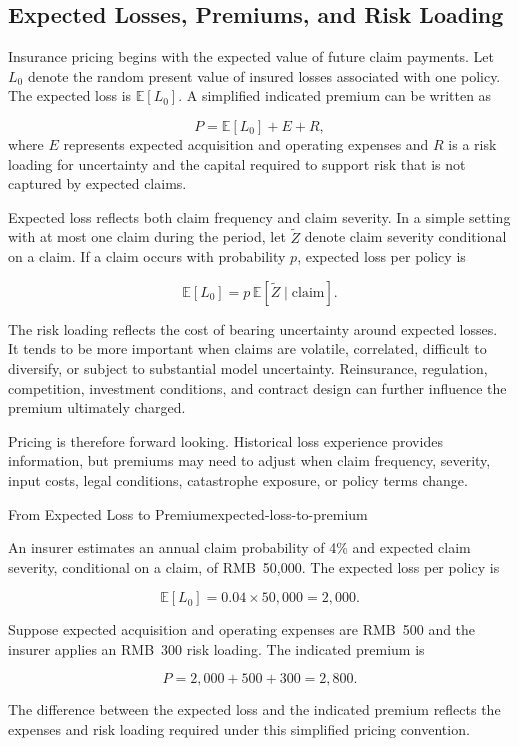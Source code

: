 \subsection{Expected Losses, Premiums, and Risk Loading}

Insurance pricing begins with the expected value of future claim payments. Let $L_{0}$ denote the random present value of insured losses associated with one policy. The expected loss is $\mathbb{E}[L_{0}]$. A simplified indicated premium can be written as

\begin{equation}
P=\mathbb{E}[L_{0}]+E+R,
\label{eq:ch15-premium-decomposition}
\end{equation}
where $E$ represents expected acquisition and operating expenses and $R$ is a risk loading for uncertainty and the capital required to support risk that is not captured by expected claims.

Expected loss reflects both claim frequency and claim severity. In a simple setting with at most one claim during the period, let $\tilde Z$ denote claim severity conditional on a claim. If a claim occurs with probability $p$, expected loss per policy is

\begin{equation}
\mathbb{E}[L_{0}]=
p\,\mathbb{E}[\tilde Z\mid \text{claim}].
\label{eq:ch15-frequency-severity}
\end{equation}

The risk loading reflects the cost of bearing uncertainty around expected losses. It tends to be more important when claims are volatile, correlated, difficult to diversify, or subject to substantial model uncertainty. Reinsurance, regulation, competition, investment conditions, and contract design can further influence the premium ultimately charged.

Pricing is therefore forward looking. Historical loss experience provides information, but premiums may need to adjust when claim frequency, severity, input costs, legal conditions, catastrophe exposure, or policy terms change.

\begin{example}{From Expected Loss to Premium}{expected-loss-to-premium}

An insurer estimates an annual claim probability of 4\% and expected claim severity, conditional on a claim, of RMB~50,000. The expected loss per policy is

$$
\mathbb{E}[L_{0}]=0.04\times 50{,}000=2{,}000.
$$

Suppose expected acquisition and operating expenses are RMB~500 and the insurer applies an RMB~300 risk loading. The indicated premium is

$$
P=2{,}000+500+300=2{,}800.
$$

The difference between the expected loss and the indicated premium reflects the expenses and risk loading required under this simplified pricing convention.

\end{example}


